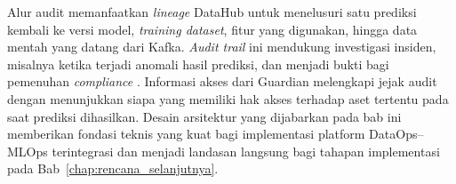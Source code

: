 Alur audit memanfaatkan \textit{lineage} DataHub untuk menelusuri satu prediksi kembali ke versi model, \textit{training dataset}, fitur yang digunakan, hingga data mentah yang datang dari Kafka. \textit{Audit trail} ini mendukung investigasi insiden, misalnya ketika terjadi anomali hasil prediksi, dan menjadi bukti bagi pemenuhan \textit{compliance} \autocite{stoyanovich2020responsible,lamer2024data}. Informasi akses dari Guardian melengkapi jejak audit dengan menunjukkan siapa yang memiliki hak akses terhadap aset tertentu pada saat prediksi dihasilkan. Desain arsitektur yang dijabarkan pada bab ini memberikan fondasi teknis yang kuat bagi implementasi platform DataOps--MLOps terintegrasi dan menjadi landasan langsung bagi tahapan implementasi pada Bab~\ref{chap:rencana_selanjutnya}.
